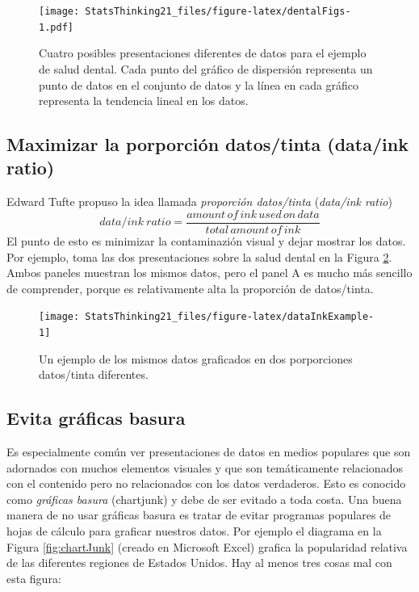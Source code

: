 \documentclass[
  12pt,
]{book}
\theoremstyle{definition}
\theoremstyle{definition}
\theoremstyle{definition}
\theoremstyle{remark}
\begin{document}
\begin{figure}
\centering
\texttt{[image: StatsThinking21\_files/figure-latex/dentalFigs-1.pdf]}
\caption{\label{fig:dentalFigs}Cuatro posibles presentaciones diferentes de datos para el ejemplo de salud dental. Cada punto del gráfico de dispersión representa un punto de datos en el conjunto de datos y la línea en cada gráfico representa la tendencia lineal en los datos.}
\end{figure}

\hypertarget{maximizar-la-porporciuxf3n-datostinta-dataink-ratio}{%
\subsection{Maximizar la porporción datos/tinta (data/ink ratio)}\label{maximizar-la-porporciuxf3n-datostinta-dataink-ratio}}

Edward Tufte propuso la idea llamada \emph{proporción datos/tinta} (\emph{data/ink ratio})
\[
data/ink\ ratio = \frac{amount\, of\, ink\, used\, on\, data}{total\, amount\, of\, ink}
\]
El punto de esto es minimizar la contaminazión visual y dejar mostrar los datos. Por ejemplo, toma las dos presentaciones sobre la salud dental en la Figura \ref{fig:dataInkExample}. Ambos paneles muestran los mismos datos, pero el panel A es mucho más sencillo de comprender, porque es relativamente alta la proporción de datos/tinta.

\begin{figure}
\texttt{[image: StatsThinking21\_files/figure-latex/dataInkExample-1]} \caption{Un ejemplo de los mismos datos graficados en dos porporciones datos/tinta diferentes.}\label{fig:dataInkExample}
\end{figure}

\hypertarget{evita-gruxe1ficas-basura}{%
\subsection{Evita gráficas basura}\label{evita-gruxe1ficas-basura}}

Es especialmente común ver presentaciones de datos en medios populares que son adornados con muchos elementos visuales y que son temáticamente relacionados con el contenido pero no relacionados con los datos verdaderos. Esto es conocido como \emph{gráficas basura} (chartjunk) y debe de ser evitado a toda costa.
Una buena manera de no usar gráficas basura es tratar de evitar programas populares de hojas de cálculo para graficar nuestros datos. Por ejemplo el diagrama en la Figura \ref{fig:chartJunk} (creado en Microsoft Excel) grafica la popularidad relativa de las diferentes regiones de Estados Unidos.
Hay al menos tres cosas mal con esta figura:
\end{document}
